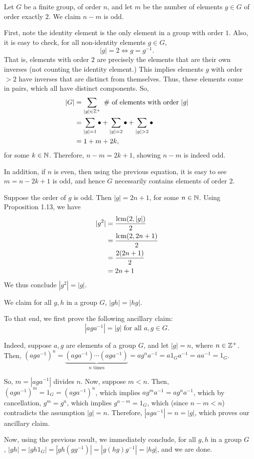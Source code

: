 \begin{xca}
Let $G$ be a finite group, of order $n$, and let $m$ be the number of elements
$g \in G$ of order exactly $2$. We claim $n-m$ is odd.

First, note the identity element is the only element in a group with order $1$.
Also, it is easy to check, for all non-identity elements $g \in G$,
\[ |g| = 2 \iff g = g^{-1}. \] That is, elements with order $2$ are precisely
the elements that are their own inverses (not counting the identity element.)
This implies elements $g$ with order $> 2$ have inverses that are distinct from
themselves. Thus, these elements come in pairs, which all have distinct
components. So,
\begin{align*}
    |G| &= \sum_{|g| \in \mathbb{Z}^+} \text{ \# of elements with order } |g| \\
        &= \sum_{|g| = 1} \bullet + \sum_{|g| = 2} \bullet + \sum_{|g| > 2}
        \bullet \\
        &= 1 + m + 2k,
\end{align*}
for some $k \in \mathbb{N}$. Therefore, $n - m = 2k + 1$, showing $n-m$ is indeed odd.

In addition, if $n$ is even, then using the previous equation, it is easy to
see $m = n - 2k + 1$ is odd, and hence $G$ necessarily contains elements of
order 2.
\end{xca}

\begin{xca}
Suppose the order of $g$ is odd. Then $|g| = 2n + 1$, for some $n \in \mathbb{N}$.
Using Proposition 1.13, we have
\begin{align*}
    |g^2| &= \frac{\operatorname{lcm}(2, |g|)}{2} \\
          &= \frac{\operatorname{lcm}(2, 2n + 1)}{2} \\
          &= \frac{2(2n + 1)}{2} \\
          &= 2n + 1
\end{align*}
We thus conclude $|g^2| = |g|$.
\end{xca}

\begin{xca}
We claim for all $g, h$ in a group $G$, $|gh| = |hg|$.

To that end, we first prove the following ancillary claim:
\[ |aga^{-1}| = |g| \text{ for all } a, g \in G. \]

Indeed, suppose $a, g$ are elements of a group $G$, and let $|g| = n$, where
$n \in \mathbb{Z}^+$. Then, $(aga^{-1})^n = \underbrace{(aga^{-1}) \cdots
(aga^{-1})}_{n \text{ times}} = a g^n a^{-1} = a 1_G a^{-1} = aa^{-1} = 1_G$.

So, $m = |aga^{-1}|$ divides $n$. Now, suppose $m < n$. Then, $(aga^{-1})^m =
1_G = (aga^{-1})^n$, which implies $a g^m a^{-1} = a g^n a^{-1}$, which by
cancellation, $g^m = g^n$, which implies $g^{n-m} = 1_G$, which (since
$n-m < n$) contradicts the assumption $|g| = n$. Therefore, $|aga^{-1}| = n =
|g|$, which proves our ancillary claim.

Now, using the previous result, we immediately conclude, for all $g, h$ in a
group $G$, $|gh| = |gh1_G| = |gh(gg^{-1})| = |g(hg)g^{-1}| = |hg|$, and we are
done.
\end{xca}

